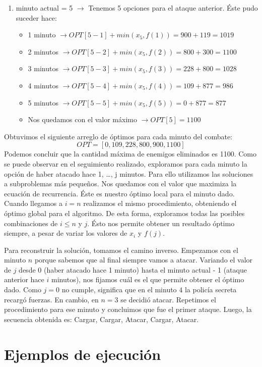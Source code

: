 \documentclass{article}
\begin{document}
\begin{enumerate}
    \item minuto actual = 5 $\rightarrow$ Tenemos 5 opciones para el ataque anterior. Éste pudo suceder hace:
    \begin{itemize}
        \item 1 minuto $\rightarrow OPT[5-1] + min(x_5, f(1)) = 900 + 119 = 1019$
        \item 2 minutos $\rightarrow OPT[5-2] + min(x_5, f(2)) = 800 + 300 = 1100$
        \item 3 minutos $\rightarrow OPT[5-3] + min(x_5, f(3)) = 228 + 800 = 1028$
        \item 4 minutos $\rightarrow OPT[5-4] + min(x_5, f(4)) = 109 + 877 = 986$
        \item 5 minutos $\rightarrow OPT[5-5] + min(x_5, f(5)) = 0 + 877 = 877$
        \item Nos quedamos con el valor máximo $\rightarrow OPT[5] = 1100$     
    \end{itemize}
\end{enumerate}
Obtuvimos el siguiente arreglo de óptimos para cada minuto del combate:
$$
OPT = [0, 109, 228, 800, 900, 1100]
$$
Podemos concluir que la cantidad máxima de enemigos eliminados es 1100. Como se puede observar en el seguimiento realizado, exploramos para cada minuto la opción de haber atacado hace 1, \dots, j minutos. Para ello utilizamos las soluciones a subproblemas más pequeños. Nos quedamos con el valor que maximiza la ecuación de recurrencia. Éste es nuestro óptimo local para el minuto dado. Cuando llegamos a $i = n$ realizamos el mismo procedimiento, obteniendo el óptimo global para el algoritmo. De esta forma, exploramos todas las posibles combinaciones de $i \leq n$ y $j$. Ésto nos permite obtener un resultado óptimo siempre, a pesar de variar los valores de $x_i$ y $f(j)$.

Para reconstruir la solución, tomamos el camino inverso. Empezamos con el minuto $n$ porque sabemos que al final siempre vamos a atacar. Variando el valor de $j$ desde 0 (haber atacado hace 1 minuto) hasta el minuto actual - 1 (ataque anterior hace $i$ minutos), nos fijamos cuál es el que permite obtener el óptimo dado. Como $j = 0$ no cumple, significa que en el minuto $4$ la policía secreta recargó fuerzas. En cambio, en $n = 3$ se decidió atacar. Repetimos el procedimiento para ese minuto y concluimos que fue el primer ataque. Luego, la secuencia obtenida es: Cargar, Cargar, Atacar, Cargar, Atacar.

\section{Ejemplos de ejecución}
\label{sec:ejemplos}
\end{document}
